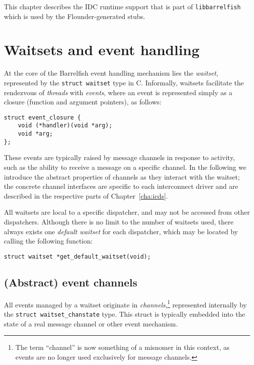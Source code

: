 \documentclass[a4paper,twoside]{report} %
\begin{document}
This chapter describes the IDC runtime support that is part of
\texttt{libbarrelfish} which is used by the Flounder-generated stubs.

\section{Waitsets and event handling}
\label{sec:waitset}

At the core of the Barrelfish event handling mechanism lies the \emph{waitset},
represented by the \lstinline+struct waitset+ type in C. Informally, waitsets
facilitate the rendezvous of \emph{threads} with \emph{events}, where an event
is represented simply as a closure (function and argument pointers), as follows:

\begin{lstlisting}
struct event_closure {
    void (*handler)(void *arg);
    void *arg;
};
\end{lstlisting}

These events are typically raised by message channels in response to activity,
such as the ability to receive a message on a specific channel. In the
following we introduce the abstract properties of channels as they interact
with the waitset; the concrete channel interfaces are specific to each
interconnect driver and are described in the respective parts of
Chapter~\ref{cha:icds}.

All waitsets are local to a specific dispatcher, and may not be accessed from
other dispatchers. Although there is no limit to the number of waitsets used,
there always exists one \emph{default waitset} for each dispatcher, which
may be located by calling the following function:

\begin{lstlisting}
struct waitset *get_default_waitset(void);
\end{lstlisting}


\subsection{(Abstract) event channels}

All events managed by a waitset originate in \emph{channels},\footnote{The
term ``channel'' is now something of a misnomer in this context, as events are
no longer used exclusively for message channels.} represented internally by the
\lstinline+struct waitset_chanstate+ type. This struct is typically embedded
into the state of a real message channel or other event mechanism.
\end{document}
